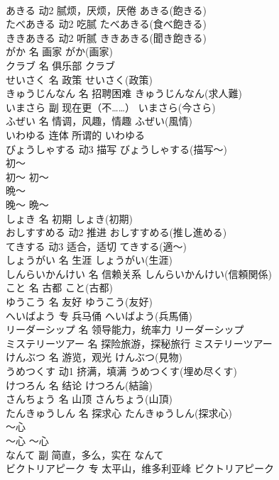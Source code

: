 \documentclass[8pt]{extreport}
\begin{document}
\begin{CJK}{UTF8}{min}
\\	あきる	动2	腻烦，厌烦，厌倦	あきる(飽きる)	
\\	たべあきる	动2	吃腻	たべあきる(食べ飽きる)	
\\	ききあきる	动2	听腻	ききあきる(聞き飽きる)	
\\	がか	名	画家	がか(画家)	
\\	クラブ	名	俱乐部	クラブ	
\\	せいさく	名	政策	せいさく(政策)	
\\	きゅうじんなん	名	招聘困难	きゅうじんなん(求人難)	
\\	いまさら	副	现在更（不……）	いまさら(今さら)	
\\	ふぜい	名	情调，风趣，情趣	ふぜい(風情)	
\\	いわゆる	连体	所谓的	いわゆる	
\\	びょうしゃする	动3	描写	びょうしゃする(描写～)	
\\	初～	
\\	初～	初～	
\\	晩～	
\\	晚～	晩～	
\\	しょき	名	初期	しょき(初期)	
\\	おしすすめる	动2	推进	おしすすめる(推し進める)	
\\	てきする	动3	适合，适切	てきする(適～)	
\\	しょうがい	名	生涯	しょうがい(生涯)	
\\	しんらいかんけい	名	信赖关系	しんらいかんけい(信頼関係)	
\\	こと	名	古都	こと(古都)	
\\	ゆうこう	名	友好	ゆうこう(友好)	
\\	へいばよう	专	兵马俑	へいばよう(兵馬俑)	
\\	リーダーシップ	名	领导能力，统率力	リーダーシップ	
\\	ミステリーツアー	名	探险旅游，探秘旅行	ミステリーツアー	
\\	けんぶつ	名	游览，观光	けんぶつ(見物)	
\\	うめつくす	动1	挤满，填满	うめつくす(埋め尽くす)	
\\	けつろん	名	结论	けつろん(結論)	
\\	さんちょう	名	山顶	さんちょう(山頂)	
\\	たんきゅうしん	名	探求心	たんきゅうしん(探求心)	
\\	～心	
\\	～心	～心	
\\	なんて	副	简直，多么，实在	なんて	
\\	ビクトリアピーク	专	太平山，维多利亚峰	ビクトリアピーク	

\end{CJK}
\end{document}
